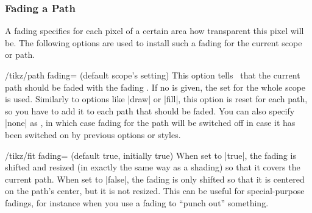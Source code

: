 \subsubsection{Fading a Path}

A fading specifies for each pixel of a certain area how transparent this pixel
will be. The following options are used to install such a fading for the
current scope or path.


\begin{key}{/tikz/path fading= (default \normalfont scope's setting)}
    This option tells \tikzname\ that the current path should be faded with the
    fading . If no  is given, the  set for the
    whole scope is used. Similarly to options like |draw| or |fill|, this
    option is reset for each path, so you have to add it to each path that
    should be faded. You can also specify |none| as , in which case
    fading for the path will be switched off in case it has been switched on by
    previous options or styles.
\begin{codeexample}[preamble={\usetikzlibrary{fadings,patterns}}]
\end{codeexample}

    \begin{key}{/tikz/fit fading= (default true, initially true)}
        When set to |true|, the fading is shifted and resized (in exactly the
        same way as a shading) so that it covers the current path. When set to
        |false|, the fading is only shifted so that it is centered on the
        path's center, but it is not resized. This can be useful for
        special-purpose fadings, for instance when you use a fading to ``punch
        out'' something.
    \end{key}


\end{key}
